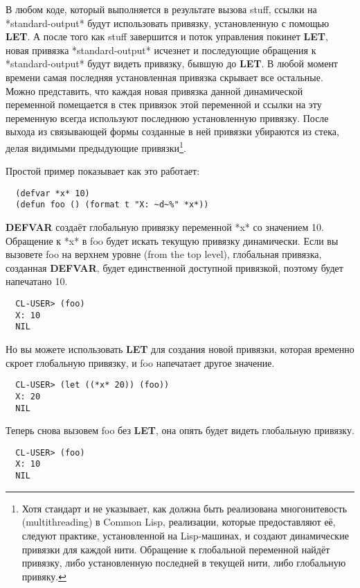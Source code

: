 В любом коде, который выполняется в результате вызова stuff, ссылки на *standard-output*
будут использовать привязку, установленную с помощью \textbf{LET}. А после того как stuff
завершится и поток управления покинет \textbf{LET}, новая привязка *standard-output*
исчезнет и последующие обращения к *standard-output* будут видеть привязку, бывшую до
\textbf{LET}. В любой момент времени самая последняя установленная привязка скрывает все
остальные. Можно представить, что каждая новая привязка данной динамической переменной
помещается в стек привязок этой переменной и ссылки на эту переменную всегда используют
последнюю установленную привязку. После выхода из связывающей формы созданные в ней
привязки убираются из стека, делая видимыми предыдующие привязки\footnote{Хотя стандарт и
  не указывает, как должна быть реализована многонитевость (multithreading) в Common Lisp,
  реализации, которые предоставляют её, следуют практике, установленной на Lisp-машинах, и
  создают динамические привязки для каждой нити. Обращение к глобальной переменной найдёт
  привязку, либо установленную последней в текущей нити, либо глобальную привяку.}.

Простой пример показывает как это работает:

\begin{lstlisting}
  (defvar *x* 10)
  (defun foo () (format t "X: ~d~%" *x*))
\end{lstlisting}

\textbf{DEFVAR} создаёт глобальную привязку переменной *x* со значением 10. Обращение к
*x* в foo будет искать текущую привязку динамически. Если вы вызовете foo на верхнем
уровне (from the top level), глобальная привязка, созданная \textbf{DEFVAR}, будет
единственной доступной привязкой, поэтому будет напечатано 10.

\begin{verbatim}
  CL-USER> (foo)
  X: 10
  NIL
\end{verbatim}

Но вы можете использовать \textbf{LET} для создания новой привязки, которая временно
скроет глобальную привязку, и foo напечатает другое значение.

\begin{verbatim}
  CL-USER> (let ((*x* 20)) (foo))
  X: 20
  NIL
\end{verbatim}

Теперь снова вызовем foo без \textbf{LET}, она опять будет видеть глобальную привязку.

\begin{verbatim}
  CL-USER> (foo)
  X: 10
  NIL
\end{verbatim}

